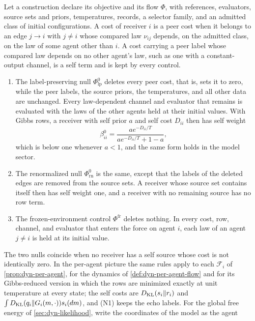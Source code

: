 Let a construction declare its objective and its flow $\Phi$, with
references, evaluators, source sets and priors, temperatures, records, a
selector family, and an admitted class of initial configurations. A cost of
receiver $i$ is a peer cost when it belongs to an edge $j\to i$ with
$j\neq i$ whose compared law $\nu_{ij}$ depends, on the admitted class, on
the law of some agent other than $i$. A cost carrying a peer label whose
compared law depends on no other agent's law, such as one with a
constant-output channel, is a self term and is kept by every control.
\begin{enumerate}
\item[(N1)] The label-preserving null $\Phi^0_{\mathrm{lp}}$ deletes every
peer cost, that is, sets it to zero, while the peer labels, the source
priors, the temperatures, and all other data are unchanged. Every
law-dependent channel and evaluator that remains is evaluated with the laws
of the other agents held at their initial values. With Gibbs rows, a
receiver with self prior $a$ and self cost $D_{ii}$ then has self weight
\begin{equation}
 \beta^0_{ii}=\frac{ae^{-D_{ii}/T}}{ae^{-D_{ii}/T}+1-a},
 \label{inh:null-self-row}
\end{equation}
which is below one whenever $a<1$, and the same form holds in the model
sector.
\item[(N2)] The renormalized null $\Phi^0_{\mathrm{rn}}$ is the same, except
that the labels of the deleted edges are removed from the source sets. A
receiver whose source set contains itself then has self weight one, and a
receiver with no remaining source has no row term.
\item[(N3)] The frozen-environment control $\Phi^{\mathrm{fr}}$ deletes
nothing. In every cost, row, channel, and evaluator that enters the force on
agent $i$, each law of an agent $j\neq i$ is held at its initial value.
\end{enumerate}
The two nulls coincide when no receiver has a self source whose cost is not
identically zero. In the per-agent picture the same rules apply to each
$\mathcal F_i$ of \cref{prop:dyn-per-agent}, for the dynamics of
\cref{def:dyn-per-agent-flow} and for its Gibbs-reduced version in which the
rows are minimized exactly at unit temperature at every state; the self
costs are $D_{\mathrm{KL}}(s_i\Vert r_i)$ and $\int D_{\mathrm{KL}}(q_i\Vert G_i(m,\cdot))s_i(dm)$,
and (N1) keeps the echo labels. For the global free energy of
\cref{sec:dyn-likelihood}, write the coordinates of the model as the agent
